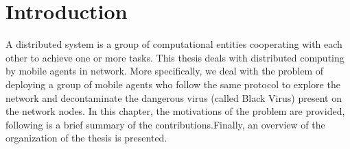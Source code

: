 \chapter {Introduction}
\label{INTRO}

  A distributed system is a group of computational entities cooperating with each other to achieve one or more tasks. This thesis deals with distributed computing by mobile agents in network. More specifically, we deal with the problem of deploying a group of mobile agents who follow the same protocol to explore the network and decontaminate the dangerous virus (called Black Virus) present on the network nodes.
  In this chapter, the motivations of the problem are provided, following is a brief summary of the contributions.Finally, an overview of the organization of the thesis is presented.


